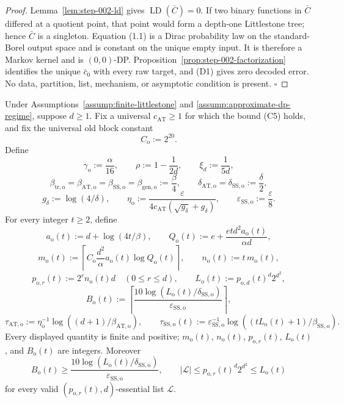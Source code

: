 \begin{proof}
Lemma~\ref{lem:step-002-ld} gives
\(\operatorname{LD}(\bar C)=0\). If two binary functions in \(\bar C\)
differed at a quotient point, that point would form a depth-one
Littlestone tree; hence \(\bar C\) is a singleton. Equation (1.1) is a
Dirac probability law on the standard-Borel output space and is constant
on the unique empty input. It is therefore a Markov kernel and is
\((0,0)\)-DP. Proposition~\ref{prop:step-002-factorization}
identifies the unique \(\bar c_0\) with every raw target, and (D1) gives
zero decoded error. No data, partition, list, mechanism, or asymptotic
condition is present. \(\square\)


\end{proof}

\begin{lemma}\label{lem:step-015-dictionary}
Under Assumptions~\ref{assump:finite-littlestone} and
\ref{assump:approximate-dp-regime}, suppose \(d\ge1\). Fix a universal
\(c_{\mathrm{AT}}\ge1\) for which the bound (C5) holds, and
fix the universal old block constant
\[
C_{\mathrm o}:=2^{20}.
\tag{2.1}
\]
Define
\[
\gamma_{\mathrm o}:=\frac{\alpha}{16},\qquad
\rho:=1-\frac1{2d},\qquad \xi_d:=\frac1{5d},
\tag{2.2}
\]
\[
\beta_{\mathrm{tr,o}}=\beta_{\mathrm{AT,o}}
=\beta_{\mathrm{SS,o}}=\beta_{\mathrm{gen,o}}:=\frac\beta4,
\qquad
\delta_{\mathrm{AT,o}}=\delta_{\mathrm{SS,o}}:=\frac\delta2,
\tag{2.3}
\]
\[
g_\delta:=\log(4/\delta),\qquad
\eta_{\mathrm o}:=
\frac{\varepsilon}
{4c_{\mathrm{AT}}(\sqrt{g_\delta}+g_\delta)},\qquad
\varepsilon_{\mathrm{SS,o}}:=\frac\varepsilon8.
\tag{2.4}
\]
For every integer \(t\ge2\), define
\[
a_{\mathrm o}(t):=d+\log(4t/\beta),\qquad
Q_{\mathrm o}(t):=
e+\frac{etd^2a_{\mathrm o}(t)}{\alpha d},
\tag{2.5}
\]
\[
m_{\mathrm o}(t):=
\left\lceil C_{\mathrm o}\frac{d^2}{\alpha}
a_{\mathrm o}(t)\log Q_{\mathrm o}(t)\right\rceil,\qquad
n_{\mathrm o}(t):=t\,m_{\mathrm o}(t),
\tag{2.6}
\]
\[
p_{\mathrm o,r}(t):=2^rn_{\mathrm o}(t)d
\quad(0\le r\le d),\qquad
L_{\mathrm o}(t):=p_{\mathrm o,d}(t)^d2^{d^2},
\tag{2.7}
\]
\[
B_{\mathrm o}(t):=
\left\lceil
\frac{10\log(L_{\mathrm o}(t)/\delta_{\mathrm{SS,o}})}
{\varepsilon_{\mathrm{SS,o}}}\right\rceil,
\tag{2.8}
\]
\[
\tau_{\mathrm{AT,o}}:=
\eta_{\mathrm o}^{-1}
\log((d+1)/\beta_{\mathrm{AT,o}}),\qquad
\tau_{\mathrm{SS,o}}(t):=
\varepsilon_{\mathrm{SS,o}}^{-1}
\log((tL_{\mathrm o}(t)+1)/\beta_{\mathrm{SS,o}}).
\tag{2.9}
\]
Every displayed quantity is finite and positive; \(m_{\mathrm o}(t)\),
\(n_{\mathrm o}(t)\), \(p_{\mathrm o,r}(t)\), \(L_{\mathrm o}(t)\), and
\(B_{\mathrm o}(t)\) are integers. Moreover
\[
B_{\mathrm o}(t)\ge
\frac{10\log(L_{\mathrm o}(t)/\delta_{\mathrm{SS,o}})}
{\varepsilon_{\mathrm{SS,o}}},
\qquad
|\mathcal L|\le p_{\mathrm o,r}(t)^d2^{d^2}
\le L_{\mathrm o}(t)
\tag{2.10}
\]
for every valid \((p_{\mathrm o,r}(t),d)\)-essential list
\(\mathcal L\).


\end{lemma}


